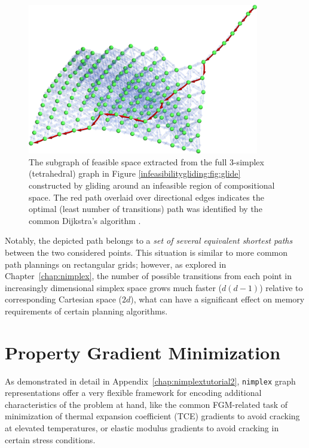 \begin{figure}[H]
    \centering
    \includegraphics[width=0.9\textwidth]{pathplanning/InfeasibilityGliding_Feasible.png}
    \caption{The subgraph of feasible space extracted from the full 3-simplex (tetrahedral) graph in Figure \ref{infeasibilitygliding:fig:glide} constructed by gliding around an infeasible region of compositional space. The red path overlaid over directional edges indicates the optimal (least number of transitions) path was identified by the common Dijkstra's algorithm \cite{Dijkstra1959AGraphs}.}
    \label{pathplan:fig:shortestpath}
\end{figure}

Notably, the depicted path belongs to a \emph{set of several equivalent shortest paths} between the two considered points. This situation is similar to more common path plannings on rectangular grids; however, as explored in Chapter~\ref{chap:nimplex}, the number of possible transitions from each point in increasingly dimensional simplex space grows much faster ($d(d-1)$) relative to corresponding Cartesian space ($2d$), what can have a significant effect on memory requirements of certain planning algorithms.

\section{Property Gradient Minimization} \label{pathplan:sec:gradientmin}

As demonstrated in detail in Appendix~\ref{chap:nimplextutorial2}, \texttt{nimplex} graph representations offer a very flexible framework for encoding additional characteristics of the problem at hand, like the common FGM-related task of minimization of thermal expansion coefficient (TCE) gradients \cite{Kirk2021ComputationalMonotonicity} to avoid cracking at elevated temperatures, or elastic modulus gradients to avoid cracking in certain stress conditions.



